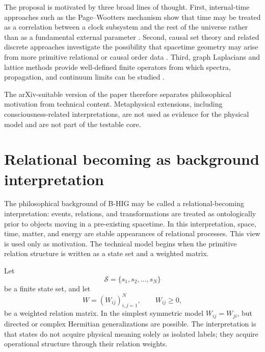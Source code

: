 \documentclass[11pt,a4paper]{article}
\newcommand{\BHIG}{B-HIG}
\begin{document}
The proposal is motivated by three broad lines of thought. First, internal-time approaches such as the Page--Wootters mechanism show that time may be treated as a correlation between a clock subsystem and the rest of the universe rather than as a fundamental external parameter \cite{PageWootters1983}. Second, causal set theory and related discrete approaches investigate the possibility that spacetime geometry may arise from more primitive relational or causal order data \cite{Bombelli1987,Rovelli2004}. Third, graph Laplacians and lattice methods provide well-defined finite operators from which spectra, propagation, and continuum limits can be studied \cite{Wilson1974,GinspargWilson1982,NielsenNinomiya1981}.

The arXiv-suitable version of the paper therefore separates philosophical motivation from technical content. Metaphysical extensions, including consciousness-related interpretations, are not used as evidence for the physical model and are not part of the testable core.

\section{Relational becoming as background interpretation}
The philosophical background of \BHIG{} may be called a relational-becoming interpretation: events, relations, and transformations are treated as ontologically prior to objects moving in a pre-existing spacetime. In this interpretation, space, time, matter, and energy are stable appearances of relational processes. This view is used only as motivation. The technical model begins when the primitive relation structure is written as a state set and a weighted matrix.

Let
\[
\mathcal{S}=\{s_1,s_2,\ldots,s_N\}
\]
be a finite state set, and let
\[
W=(W_{ij})_{i,j=1}^{N}, \qquad W_{ij}\geq 0,
\]
be a weighted relation matrix. In the simplest symmetric model $W_{ij}=W_{ji}$, but directed or complex Hermitian generalizations are possible. The interpretation is that states do not acquire physical meaning solely as isolated labels; they acquire operational structure through their relation weights.
\end{document}
